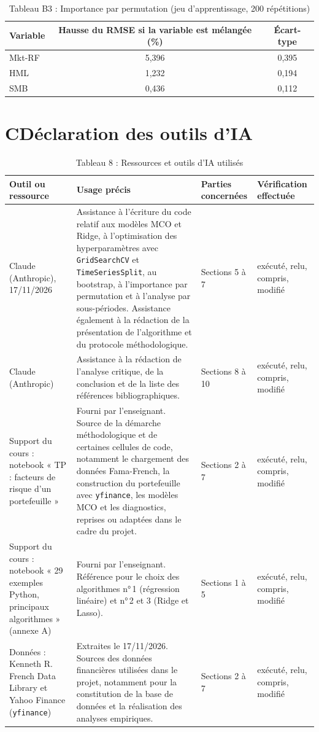 \documentclass[11pt,a4paper]{article}
\newcommand{\mkt}{Mkt-RF}
\begin{document}
\begin{table}[H]
\centering
\caption*{Tableau B3 : Importance par permutation (jeu d'apprentissage, 200 répétitions)}
\small
\begin{tabular}{|l|c|c|}
\hline
\textbf{Variable} & \textbf{Hausse du RMSE si la variable est mélangée (\%)} & \textbf{Écart-type}\\\hline
\mkt & 5,396 & 0,395\\\hline
HML & 1,232 & 0,194\\\hline
SMB & 0,436 & 0,112\\\hline
\end{tabular}
\end{table}

\section*{C\quad Déclaration des outils d'IA}

\begin{table}[H]
\centering
\caption*{Tableau 8 : Ressources et outils d'IA utilisés}
\small
\begin{tabularx}{\textwidth}{|p{2.5cm}|X|p{1.8cm}|p{2.2cm}|}
\hline
\textbf{Outil ou ressource} & \textbf{Usage précis} & \textbf{Parties concernées} & \textbf{Vérification effectuée}\\\hline
Claude (Anthropic), 17/11/2026 & Assistance à l'écriture du code relatif aux modèles MCO et Ridge, à l'optimisation des hyperparamètres avec \texttt{GridSearchCV} et \texttt{TimeSeriesSplit}, au bootstrap, à l'importance par permutation et à l'analyse par sous-périodes. Assistance également à la rédaction de la présentation de l'algorithme et du protocole méthodologique. & Sections 5 à 7 & exécuté, relu, compris, modifié\\\hline
Claude (Anthropic) & Assistance à la rédaction de l'analyse critique, de la conclusion et de la liste des références bibliographiques. & Sections 8 à 10 & exécuté, relu, compris, modifié\\\hline
Support du cours : notebook « TP : facteurs de risque d'un portefeuille » & Fourni par l'enseignant. Source de la démarche méthodologique et de certaines cellules de code, notamment le chargement des données Fama-French, la construction du portefeuille avec \texttt{yfinance}, les modèles MCO et les diagnostics, reprises ou adaptées dans le cadre du projet. & Sections 2 à 7 & exécuté, relu, compris, modifié\\\hline
Support du cours : notebook « 29 exemples Python, principaux algorithmes » (annexe A) & Fourni par l'enseignant. Référence pour le choix des algorithmes n°\,1 (régression linéaire) et n°\,2 et 3 (Ridge et Lasso). & Sections 1 à 5 & exécuté, relu, compris, modifié\\\hline
Données : Kenneth R. French Data Library et Yahoo Finance (\texttt{yfinance}) & Extraites le 17/11/2026. Sources des données financières utilisées dans le projet, notamment pour la constitution de la base de données et la réalisation des analyses empiriques. & Sections 2 à 7 & exécuté, relu, compris, modifié\\\hline
\end{tabularx}
\end{table}
\end{document}
